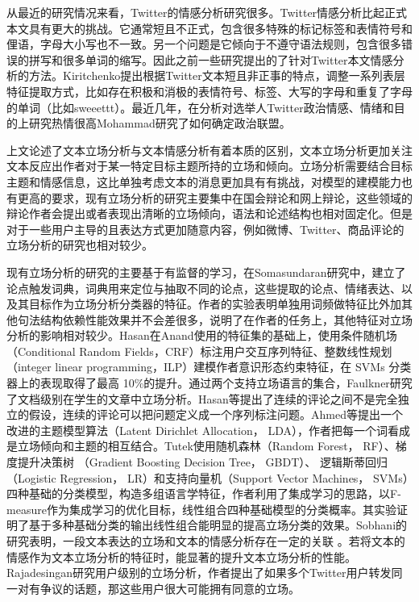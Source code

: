从最近的研究情况来看，Twitter的情感分析研究很多。Twitter情感分析比起正式本文具有更大的挑战。它通常短且不正式，包含很多特殊的标记标签和表情符号和俚语，字母大小写也不一致。另一个问题是它倾向于不遵守语法规则，包含很多错误的拼写和很多单词的缩写。因此之前一些研究提出的了针对Twitter本文情感分析的方法。Kiritchenko提出根据Twitter文本短且非正事的特点，调整一系列表层特征提取方式，比如存在积极和消极的表情符号、标签、大写的字母和重复了字母的单词（比如sweeettt）。最近几年，在分析对选举人Twitter政治情感、情绪和目的上研究热情很高Mohammad研究了如何确定政治联盟。


上文论述了文本立场分析与文本情感分析有着本质的区别，文本立场分析更加关注文本反应出作者对于某一特定目标主题所持的立场和倾向。立场分析需要结合目标主题和情感信息，这比单独考虑文本的消息更加具有有挑战，对模型的建模能力也有更高的要求，现有立场分析的研究主要集中在国会辩论和网上辩论，这些领域的辩论作者会提出或者表现出清晰的立场倾向，语法和论述结构也相对固定化。但是对于一些用户主导的且表达方式更加随意内容，例如微博、Twitter、商品评论的立场分析的研究也相对较少。

现有立场分析的研究的主要基于有监督的学习，在Somasundaran研究中，建立了论点触发词典，词典用来定位与抽取不同的论点，这些提取的论点、情绪表达、以及其目标作为立场分析分类器的特征。作者的实验表明单独用词频做特征比外加其他句法结构依赖性能效果并不会差很多，说明了在作者的任务上，其他特征对立场分析的影响相对较少。Hasan在Anand使用的特征集的基础上，使用条件随机场（Conditional Random Fields，CRF）标注用户交互序列特征、整数线性规划（integer linear programming，ILP）建模作者意识形态约束特征，在 SVMs 分类器上的表现取得了最高 10\%的提升。通过两个支持立场语言的集合，Faulkner研究了文档级别在学生的文章中立场分析。Hasan等提出了连续的评论之间不是完全独立的假设，连续的评论可以把问题定义成一个序列标注问题。Ahmed等提出一个改进的主题模型算法（Latent Dirichlet Allocation， LDA），作者把每一个词看成是立场倾向和主题的相互结合。Tutek使用随机森林（Random Forest， RF）、梯度提升决策树 （Gradient Boosting Decision Tree， GBDT）、 逻辑斯蒂回归 （Logistic Regression， LR）和支持向量机（Support Vector Machines， SVMs）四种基础的分类模型，构造多组语言学特征，作者利用了集成学习的思路，以F-measure作为集成学习的优化目标，线性组合四种基础模型的分类概率。其实验证明了基于多种基础分类的输出线性组合能明显的提高立场分类的效果。Sobhani的研究表明，一段文本表达的立场和文本的情感分析存在一定的关联 。若将文本的情感作为文本立场分析的特征时，能显著的提升文本立场分析的性能。Rajadesingan研究用户级别的立场分析，作者提出了如果多个Twitter用户转发同一对有争议的话题，那这些用户很大可能拥有同意的立场。

